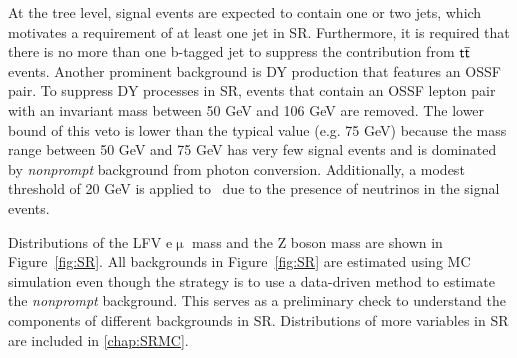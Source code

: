 At the tree level, signal events are expected to contain one or two jets, which motivates a requirement of at least one jet in \ac{SR}. Furthermore, it is required that there is no more than one b-tagged jet to suppress the contribution from $\textsf{t}\overline{\textsf{t}}$ events. Another prominent background is \ac{DY} production that features an \ac{OSSF} pair. To suppress \ac{DY} processes in \ac{SR}, events that contain an \ac{OSSF} lepton pair with an invariant mass between 50 GeV and 106 GeV are removed. The lower bound of this veto is lower than the typical value (e.g. 75 GeV) because the mass range between 50 GeV and 75 GeV has very few signal events and is dominated by \emph{nonprompt} background from photon conversion. Additionally, a modest threshold of 20 GeV is applied to \MET~due to the presence of neutrinos in the signal events.

Distributions of the LFV e$\upmu$ mass and the Z boson mass are shown in Figure~\ref{fig:SR}. All backgrounds in Figure~\ref{fig:SR} are estimated using \ac{MC} simulation even though the strategy is to use a data-driven method to estimate the \emph{nonprompt} background. This serves as a preliminary check to understand the components of different backgrounds in \ac{SR}. Distributions of more variables in \ac{SR} are included in \autoref{chap:SRMC}.

